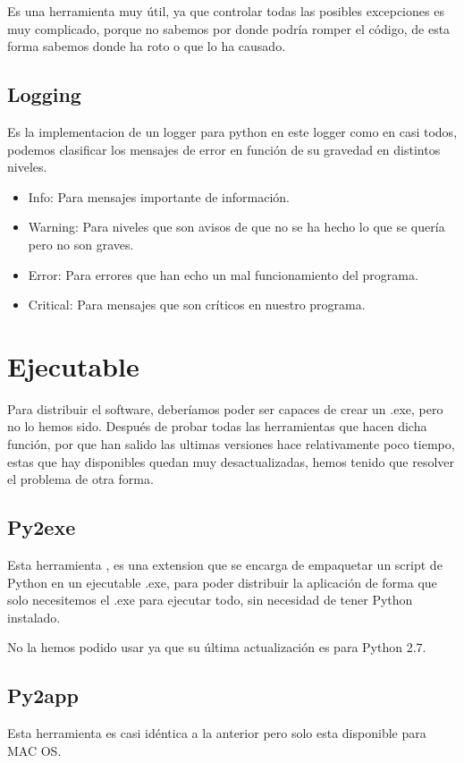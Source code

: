 Es una herramienta muy útil, ya que controlar todas las posibles excepciones es muy complicado, porque no sabemos por donde podría romper el código, de esta forma sabemos donde ha roto o que lo ha causado.

\subsection{Logging}
Es la implementacion de un logger para python \cite{python:logger} en este logger como en casi todos, podemos clasificar los mensajes de error en función de su gravedad en distintos niveles.

\begin{itemize}
\item Info: Para mensajes importante de información.
\item Warning: Para niveles que son avisos de que no se ha hecho lo que se quería pero no son graves.
\item Error: Para errores que han echo un mal funcionamiento del programa.
\item Critical: Para mensajes que son críticos en nuestro programa.
\end{itemize}

\section{Ejecutable}
Para distribuir el software, deberíamos poder ser capaces de crear un .exe, pero no lo hemos sido.
Después de probar todas las herramientas que hacen dicha función,  por que han salido las ultimas versiones hace relativamente poco tiempo, estas que hay disponibles quedan muy desactualizadas, hemos tenido que resolver el problema de otra forma. 

\subsection{Py2exe}
Esta herramienta \cite{p2exe}, es una extension que se encarga de empaquetar un script de Python en un ejecutable .exe, para poder distribuir la aplicación de forma que solo necesitemos el .exe para ejecutar todo, sin necesidad de tener Python instalado.

No la hemos podido usar ya que su última actualización es para Python 2.7.

\subsection{Py2app}
Esta herramienta es casi idéntica a la anterior pero solo esta disponible para MAC OS.

